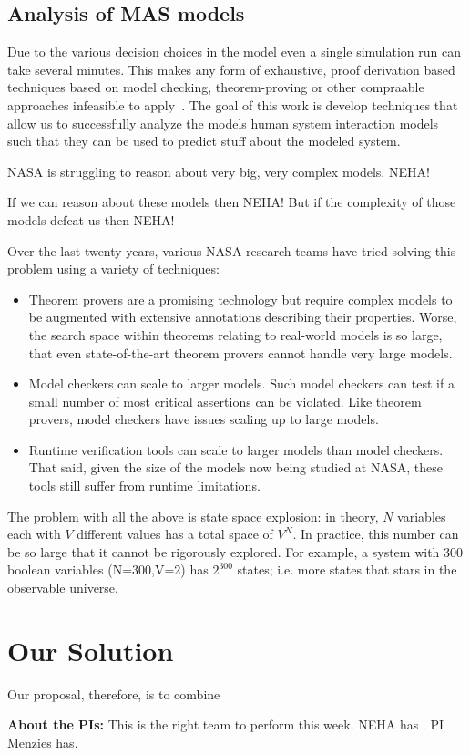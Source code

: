 \documentclass[12pt]{article}
\newcommand{\bi}{\begin{itemize}[leftmargin=0.7cm]}
\newcommand{\ei}{\end{itemize}}
\begin{document}
\subsection{Analysis of MAS models} 
Due to the various decision choices in the model even a single simulation run can take several minutes. This makes any form of exhaustive, proof derivation based techniques based on model checking, theorem-proving or other compraable approaches infeasible to apply~\cite{hunter:aamas13,raimondi:aamas14}. The goal of this work is develop techniques that allow us to successfully analyze the models human system interaction models such that they can be used to predict stuff about the modeled system. 

NASA is struggling to reason about very big, very complex models. NEHA! 

If we can reason about these models then NEHA! But if the complexity of those models
defeat us then NEHA!

Over the last twenty years, various
NASA research teams have tried solving this problem using a variety of techniques:
\bi
\item Theorem provers are a promising technology but require complex models to be augmented with extensive annotations describing their properties. Worse, the search space within theorems relating to real-world models is so large, that even state-of-the-art theorem provers cannot handle very large models.
\item Model checkers can scale to larger models. Such model checkers can test if a small number of most critical assertions can be violated. Like theorem provers, model checkers
have issues scaling up to large models.
\item Runtime verification tools can scale to larger models than model checkers. That
said, given the size of the models now being studied at NASA, these tools still suffer
from runtime limitations.
\ei
The problem with all the above is   state space explosion: in theory,
$N$ variables each with $V$ different values has a total space of $V^N$. In practice,
this number can be so large that it cannot be rigorously explored. For example, a system 
with 300 boolean variables (N=300,V=2) has $2^300$ states; i.e. more states that stars in the observable universe.

\section{Our Solution}





Our proposal, therefore, is to combine 

{\bf About the PIs:} This is the right team to perform this week. NEHA has . PI Menzies has.


\newpage


\end{document}
